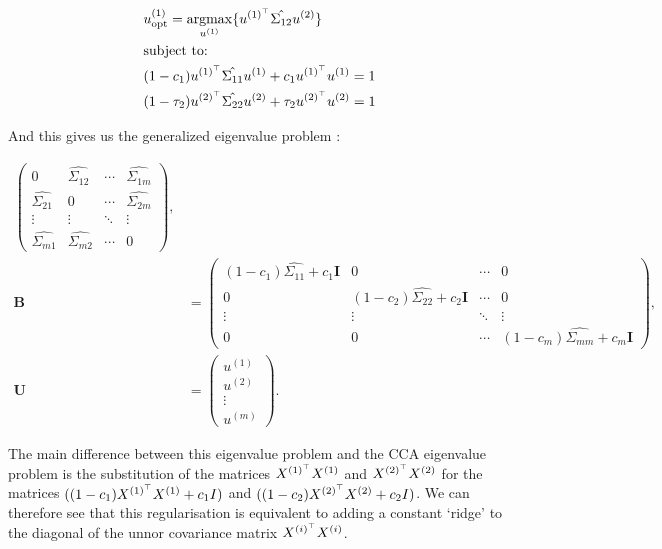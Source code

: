 \begin{align}
     & u^{(1)}_{\text{opt}} = \underset{u^{(1)}}{\mathrm{argmax}} \{ u^{(1)^{\top}} \hat{\Sigma_{12}} u^{(2)} \} \\
     & \text{subject to:} \notag \\
     & (1 - c_1) u^{(1)^{\top}} \hat{\Sigma_{11}} u^{(1)} + c_1 u^{(1)^{\top}} u^{(1)} = 1 \notag \\
     & (1 - \tau_2) u^{(2)^{\top}} \hat{\Sigma_{22}} u^{(2)} + \tau_2 u^{(2)^{\top}} u^{(2)} = 1 \notag
\end{align}

And this gives us the generalized eigenvalue problem \cite{rosipal2005overview}:

\begin{align}
    \begin{pmatrix}
        0 & \hat{\Sigma_{12}} & \cdots & \hat{\Sigma_{1m}} \\
        \hat{\Sigma_{21}} & 0 & \cdots & \hat{\Sigma_{2m}} \\
        \vdots & \vdots & \ddots & \vdots \\
        \hat{\Sigma_{m1}} & \hat{\Sigma_{m2}} & \cdots & 0
    \end{pmatrix}, \\
    \mathbf{B} &= \begin{pmatrix}
        (1-c_1)\hat{\Sigma_{11}} + c_1\mathbf{I} & 0 & \cdots & 0 \\
        0 & (1-c_2)\hat{\Sigma_{22}} + c_2\mathbf{I} & \cdots & 0 \\
        \vdots & \vdots & \ddots & \vdots \\
        0 & 0 & \cdots & (1-c_m)\hat{\Sigma_{mm}} + c_m\mathbf{I}
    \end{pmatrix}, \\
    \mathbf{U} &= \begin{pmatrix}
        u^{(1)} \\
        u^{(2)} \\
        \vdots \\
        u^{(m)}
    \end{pmatrix}.
\end{align}

The main difference between this eigenvalue problem and the CCA eigenvalue problem is the substitution of the matrices \(X^{(1)^{\top}} X^{(1)}\) and \(X^{(2)^{\top}} X^{(2)}\) for the matrices \( ((1-c_1) X^{(1)^{\top}} X^{(1)} + c_1 I) \) and \( ((1-c_2) X^{(2)^{\top}} X^{(2)} + c_2 I) \).
We can therefore see that this regularisation is equivalent to adding a constant `ridge' to the diagonal of the unnor
covariance matrix \(X^{(i)^{\top}} X^{(i)}\).

